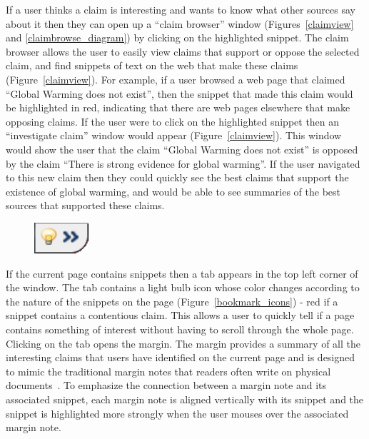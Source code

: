 \documentclass{chi2009}
\begin{document}
If a user thinks a claim is interesting and wants to know what other sources say about it then they can open up a ``claim browser'' window (Figures~\ref{claimview} and \ref{claimbrowse_diagram}) by clicking on the highlighted snippet. The claim browser allows the user to easily view claims that support or oppose the selected claim, and find snippets of text on the web that make these claims (Figure~\ref{claimview}). 
For example, if a user browsed a web page that claimed ``Global Warming does not exist'', then the snippet that made this claim would be highlighted in red, indicating that there are web pages elsewhere that make opposing claims. If the user were to click on the highlighted snippet then an ``investigate claim'' window would appear (Figure~\ref{claimview}). This window would show the user that the claim ``Global Warming does not exist'' is opposed by the claim ``There is strong evidence for global warming''. If the user navigated to this new claim then they could quickly see the best claims that support the existence of global warming, and would be able to see summaries of the best sources that supported these claims.


\begin{figure}
\includegraphics[width=2cm]{../screenshots/marginpull_out.png}
\end{figure}
If the current page contains snippets then a tab appears in the top left corner of the window. The tab contains a light bulb icon whose color changes according to the nature of the snippets on the page (Figure~\ref{bookmark_icons}) - red if a snippet contains a contentious claim. This allows a user to quickly tell if a page contains something of interest without having to scroll through the whole page. Clicking on the tab opens the margin. The margin provides a summary of all the interesting claims that users have identified on the current page and is designed to mimic the traditional margin notes that readers often write on physical documents~\cite{marginalia}. To emphasize the connection between a margin note and its associated snippet, each margin note is aligned vertically with its snippet and the snippet is highlighted more strongly when the user mouses over the associated margin note. 
\end{document}
